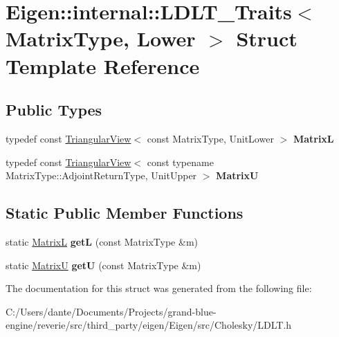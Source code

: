 \hypertarget{struct_eigen_1_1internal_1_1_l_d_l_t___traits_3_01_matrix_type_00_01_lower_01_4}{}\section{Eigen\+::internal\+::L\+D\+L\+T\+\_\+\+Traits$<$ Matrix\+Type, Lower $>$ Struct Template Reference}
\label{struct_eigen_1_1internal_1_1_l_d_l_t___traits_3_01_matrix_type_00_01_lower_01_4}
\subsection*{Public Types}
\begin{DoxyCompactItemize}
\item 
\mbox{\label{struct_eigen_1_1internal_1_1_l_d_l_t___traits_3_01_matrix_type_00_01_lower_01_4_af252a9d086be312be301820816c0a986}} 
typedef const \mbox{\hyperlink{class_eigen_1_1_triangular_view}{Triangular\+View}}$<$ const Matrix\+Type, Unit\+Lower $>$ {\bfseries MatrixL}
\item 
\mbox{\label{struct_eigen_1_1internal_1_1_l_d_l_t___traits_3_01_matrix_type_00_01_lower_01_4_a6106eb13540e7936645b13da031ef2fe}} 
typedef const \mbox{\hyperlink{class_eigen_1_1_triangular_view}{Triangular\+View}}$<$ const typename Matrix\+Type\+::\+Adjoint\+Return\+Type, Unit\+Upper $>$ {\bfseries MatrixU}
\end{DoxyCompactItemize}
\subsection*{Static Public Member Functions}
\begin{DoxyCompactItemize}
\item 
\mbox{\label{struct_eigen_1_1internal_1_1_l_d_l_t___traits_3_01_matrix_type_00_01_lower_01_4_a0bdfb73fe29737fed4e281100a3bf565}} 
static \mbox{\hyperlink{class_eigen_1_1_triangular_view}{MatrixL}} {\bfseries getL} (const Matrix\+Type \&m)
\item 
\mbox{\label{struct_eigen_1_1internal_1_1_l_d_l_t___traits_3_01_matrix_type_00_01_lower_01_4_a71b18cd5918d44a3022f4a6cb5b9da0a}} 
static \mbox{\hyperlink{class_eigen_1_1_triangular_view}{MatrixU}} {\bfseries getU} (const Matrix\+Type \&m)
\end{DoxyCompactItemize}


The documentation for this struct was generated from the following file\+:\begin{DoxyCompactItemize}
\item 
C\+:/\+Users/dante/\+Documents/\+Projects/grand-\/blue-\/engine/reverie/src/third\+\_\+party/eigen/\+Eigen/src/\+Cholesky/L\+D\+L\+T.\+h\end{DoxyCompactItemize}
